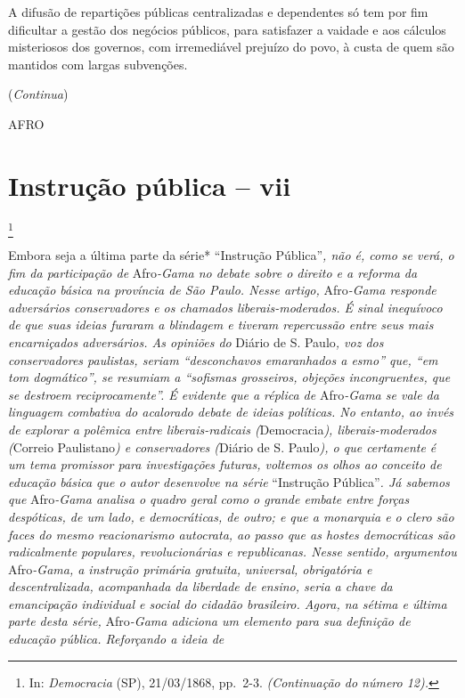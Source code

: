 A difusão de repartições públicas centralizadas e dependentes só tem por
fim dificultar a gestão dos negócios públicos, para satisfazer a vaidade
e aos cálculos misteriosos dos governos, com irremediável prejuízo do
povo, à custa de quem são mantidos com largas subvenções.

(\emph{Continua})

AFRO

\chapter{Instrução pública -- vii}\footnote{In: \emph{Democracia} (SP),
  21/03/1868, pp.~2-3. \emph{(Continuação do número 12).}}

\begin{didascalia}
Embora seja a última parte da série* ``Instrução Pública''\emph{, não é,
como se verá, o fim da participação de} Afro\emph{-Gama no debate sobre
o direito e a reforma da educação básica na província de São Paulo.
Nesse artigo,} Afro\emph{-Gama responde adversários conservadores e os
chamados liberais-moderados. É sinal inequívoco de que suas ideias
furaram a blindagem e tiveram repercussão entre seus mais encarniçados
adversários. As opiniões do} Diário de S. Paulo\emph{, voz dos
conservadores paulistas, seriam ``desconchavos emaranhados a esmo'' que,
``em tom dogmático'', se resumiam a ``sofismas grosseiros, objeções
incongruentes, que se destroem reciprocamente''. É evidente que a réplica
de} Afro\emph{-Gama se vale da linguagem combativa do acalorado debate
de ideias políticas. No entanto, ao invés de explorar a polêmica entre
liberais-radicais (}Democracia\emph{), liberais-moderados (}Correio
Paulistano\emph{) e conservadores (}Diário de S. Paulo\emph{), o que
certamente é um tema promissor para investigações futuras, voltemos os
olhos ao conceito de educação básica que o autor desenvolve na série}
``Instrução Pública''\emph{. Já sabemos que} Afro\emph{-Gama analisa o
quadro geral como o grande embate entre forças despóticas, de um lado, e
democráticas, de outro; e que a monarquia e o clero são faces do mesmo
reacionarismo autocrata, ao passo que as hostes democráticas são
radicalmente populares, revolucionárias e republicanas. Nesse sentido,
argumentou} Afro\emph{-Gama, a instrução primária gratuita, universal,
obrigatória e descentralizada, acompanhada da liberdade de ensino, seria
a chave da emancipação individual e social do cidadão brasileiro. Agora,
na sétima e última parte desta série,} Afro\emph{-Gama adiciona um
elemento para sua definição de educação pública. Reforçando a ideia de
}
\end{didascalia}
